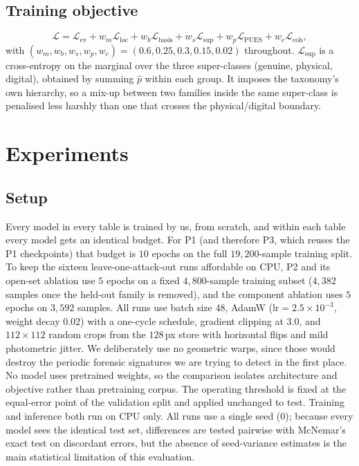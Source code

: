 \documentclass[conference]{IEEEtran}
\begin{document}
\subsection{Training objective}
\begin{equation}
\mathcal{L} = \mathcal{L}_{\text{ev}} + w_{m}\mathcal{L}_{\text{loc}}
+ w_{b}\mathcal{L}_{\text{basis}} + w_{s}\mathcal{L}_{\text{sup}}
+ w_{p}\mathcal{L}_{\text{PUES}} + w_{c}\mathcal{L}_{\text{coh}},
\end{equation}
with $(w_{m},w_{b},w_{s},w_{p},w_{c})=(0.6,0.25,0.3,0.15,0.02)$ throughout.
$\mathcal{L}_{\text{sup}}$ is a cross-entropy on the marginal over the three
super-classes (genuine, physical, digital), obtained by summing $\hat{p}$ within each
group. It imposes the taxonomy's own hierarchy, so a mix-up between two families
inside the same super-class is penalised less harshly than one that crosses the
physical/digital boundary.

\section{Experiments}\label{sec:exp}

\subsection{Setup}
Every model in every table is trained by us, from scratch, and within each table
every model gets an identical budget. For P1 (and therefore P3, which reuses the
P1 checkpoints) that budget is $10$ epochs on the full $19{,}200$-sample training
split. To keep the sixteen leave-one-attack-out runs affordable on CPU, P2 and its
open-set ablation use $5$ epochs on a fixed $4{,}800$-sample training subset
($4{,}382$ samples once the held-out family is removed), and the component
ablation uses $5$ epochs on $3{,}592$ samples. All runs use batch size $48$, AdamW
($\text{lr}=2.5\times10^{-3}$, weight decay $0.02$) with a one-cycle schedule,
gradient clipping at $3.0$, and $112\times112$ random crops from the $128$\,px store
with horizontal flips and mild photometric jitter. We deliberately use no geometric warps, since those would
destroy the periodic forensic signatures we are trying to detect in the first place.
No model uses pretrained weights, so the comparison isolates architecture and
objective rather than pretraining corpus. The operating threshold is fixed at the
equal-error point of the validation split and applied unchanged to test. Training
and inference both run on CPU only. All runs use a single seed (0); because every
model sees the identical test set, differences are tested pairwise with McNemar's
exact test on discordant errors, but the absence of seed-variance estimates is the
main statistical limitation of this evaluation.
\end{document}
